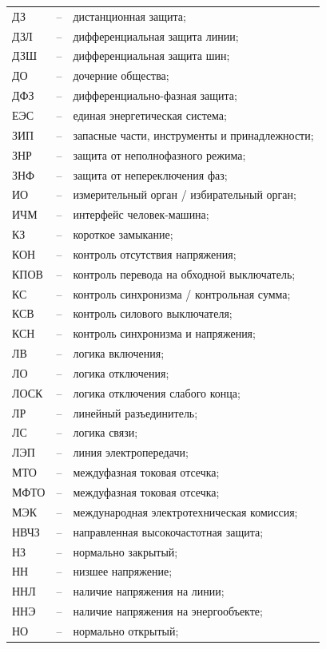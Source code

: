 \begin{longtable}{>{\raggedright\arraybackslash}m{2cm}>{\raggedright\arraybackslash}m{0.5cm}>{\raggedright\arraybackslash}m{20cm}}
ДЗ & -- & дистанционная защита; \\
ДЗЛ & -- & дифференциальная защита линии; \\
ДЗШ & -- & дифференциальная защита шин; \\
ДО & -- & дочерние общества; \\
ДФЗ & -- & дифференциально-фазная защита; \\
ЕЭС & -- & единая энергетическая система; \\
ЗИП & -- & запасные части, инструменты и принадлежности; \\
ЗНР & -- & защита от неполнофазного режима; \\
ЗНФ & -- & защита от непереключения фаз; \\
ИО & -- & измерительный орган / избирательный орган; \\
ИЧМ & -- & интерфейс человек-машина; \\
КЗ & -- & короткое замыкание; \\
КОН & -- & контроль отсутствия напряжения; \\
КПОВ & -- & контроль перевода на обходной выключатель; \\
КС & -- & контроль синхронизма / контрольная сумма; \\
КСВ & -- & контроль силового выключателя; \\
КСН & -- & контроль синхронизма и напряжения; \\
ЛВ & -- & логика включения; \\
ЛО & -- & логика отключения; \\
ЛОСК & -- & логика отключения слабого конца; \\
ЛР & -- & линейный разъединитель; \\
ЛС & -- & логика связи; \\
ЛЭП & -- & линия электропередачи; \\
МТО & -- & междуфазная токовая отсечка; \\
МФТО & -- & междуфазная токовая отсечка; \\
МЭК & -- & международная электротехническая комиссия; \\
НВЧЗ & -- & направленная высокочастотная защита; \\
НЗ & -- & нормально закрытый; \\
НН & -- & низшее напряжение; \\
ННЛ & -- & наличие напряжения на линии; \\
ННЭ & -- & наличие напряжения на энергообъекте; \\
НО & -- & нормально открытый; \\

\end{longtable}
